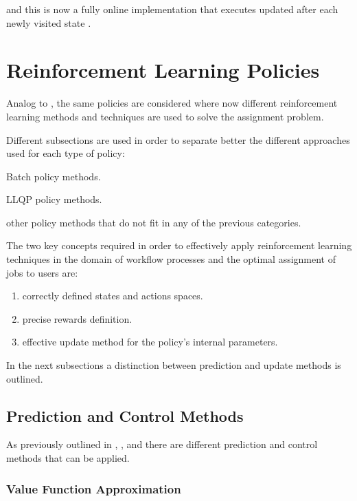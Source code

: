 \documentclass{seal_thesis}
\begin{document}
and this is now a fully online implementation that executes updated after each newly visited state \cite[p. 274]{Sutton2017}. 

\section{Reinforcement Learning Policies}
\label{sec:rl_policies}

Analog to , the same policies are considered where now different reinforcement learning methods and techniques are used to solve the assignment problem.

Different subsections are used in order to separate better the different approaches used for each type of policy:
\begin{enumerate*}
	\item Batch policy methods.
	\item LLQP policy methods.
	\item other policy methods that do not fit in any of the previous categories.
\end{enumerate*}

The two key concepts required in order to effectively apply reinforcement learning techniques in the domain of workflow processes and the optimal assignment of jobs to users are:
\begin{enumerate}
	\item correctly defined states and actions spaces.
	\item precise rewards definition.
	\item effective update method for the policy's internal parameters. 
\end{enumerate}

In the next subsections a distinction between prediction and update methods is outlined.

\subsection{Prediction and Control Methods}

As previously outlined in , ,  and  there are different prediction and control methods that can be applied.

\subsubsection{Value Function Approximation}
\end{document}
